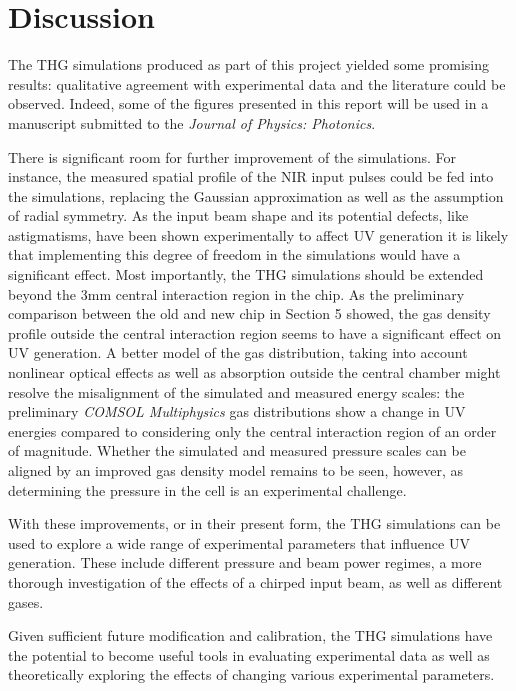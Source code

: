 \documentclass[a4paper]{jpconf}
\begin{document}
\section{Discussion}

The THG simulations produced as part of this project yielded some promising results: qualitative agreement with experimental data and the literature could be observed. Indeed, some of the figures presented in this report will be used in a manuscript submitted to the \textit{Journal of Physics: Photonics}. \par 
There is significant room for further improvement of the simulations. For instance, the measured spatial profile of the NIR input pulses could be fed into the simulations, replacing the Gaussian approximation as well as the assumption of radial symmetry. As the input beam shape and its potential defects, like astigmatisms, have been shown experimentally to affect UV generation it is likely that implementing this degree of freedom in the simulations would have a significant effect. Most importantly, the THG simulations should be extended beyond the 3mm central interaction region in the chip. As the preliminary comparison between the old and new chip in Section 5 showed, the gas density profile outside the central interaction region seems to have a significant effect on UV generation.  A better model of the gas distribution, taking into account nonlinear optical effects as well as absorption outside the central chamber might resolve the misalignment of the simulated and measured energy scales: the preliminary \textit{COMSOL Multiphysics} gas distributions show a change in UV energies compared to considering only the central interaction region of an order of magnitude. Whether the simulated and measured pressure scales can be aligned by an improved gas density model remains to be seen, however, as determining the pressure in the cell is an experimental challenge. \par 
With these improvements, or in their present form, the THG simulations can be used to explore a wide range of experimental parameters that influence UV generation. These include different pressure and beam power regimes, a more thorough investigation of the effects of a chirped input beam, as well as different gases. \par 
Given sufficient future modification and calibration, the THG simulations have the potential to become useful tools in evaluating experimental data as well as theoretically exploring the effects of changing various experimental parameters.  
\end{document}
